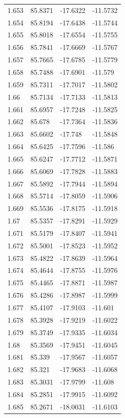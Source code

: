 \begin{tabular}{llll}
1.653 & 85.8371 & -17.6322 & -11.5732 \\
1.654 & 85.8194 & -17.6438 & -11.5744 \\
1.655 & 85.8018 & -17.6554 & -11.5755 \\
1.656 & 85.7841 & -17.6669 & -11.5767 \\
1.657 & 85.7665 & -17.6785 & -11.5779 \\
1.658 & 85.7488 & -17.6901 & -11.579 \\
1.659 & 85.7311 & -17.7017 & -11.5802 \\
1.66 & 85.7134 & -17.7133 & -11.5813 \\
1.661 & 85.6957 & -17.7248 & -11.5825 \\
1.662 & 85.678 & -17.7364 & -11.5836 \\
1.663 & 85.6602 & -17.748 & -11.5848 \\
1.664 & 85.6425 & -17.7596 & -11.586 \\
1.665 & 85.6247 & -17.7712 & -11.5871 \\
1.666 & 85.6069 & -17.7828 & -11.5883 \\
1.667 & 85.5892 & -17.7944 & -11.5894 \\
1.668 & 85.5714 & -17.8059 & -11.5906 \\
1.669 & 85.5536 & -17.8175 & -11.5918 \\
1.67 & 85.5357 & -17.8291 & -11.5929 \\
1.671 & 85.5179 & -17.8407 & -11.5941 \\
1.672 & 85.5001 & -17.8523 & -11.5952 \\
1.673 & 85.4822 & -17.8639 & -11.5964 \\
1.674 & 85.4644 & -17.8755 & -11.5976 \\
1.675 & 85.4465 & -17.8871 & -11.5987 \\
1.676 & 85.4286 & -17.8987 & -11.5999 \\
1.677 & 85.4107 & -17.9103 & -11.601 \\
1.678 & 85.3928 & -17.9219 & -11.6022 \\
1.679 & 85.3749 & -17.9335 & -11.6034 \\
1.68 & 85.3569 & -17.9451 & -11.6045 \\
1.681 & 85.339 & -17.9567 & -11.6057 \\
1.682 & 85.321 & -17.9683 & -11.6068 \\
1.683 & 85.3031 & -17.9799 & -11.608 \\
1.684 & 85.2851 & -17.9915 & -11.6092 \\
1.685 & 85.2671 & -18.0031 & -11.6103 \\

\end{tabular}

